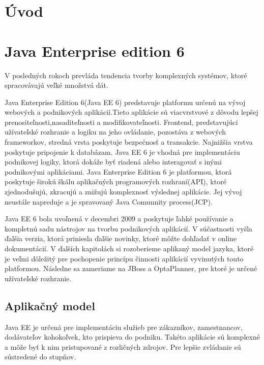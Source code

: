 

\chapter{Úvod}





\chapter{Java Enterprise edition 6}
V posledných rokoch prevláda tendencia tvorby komplexných systémov, ktoré spracovávajú veľké množstvá dát.
 


Java Enterprise Edition 6(Java EE 6) predstavuje platformu určenú na vývoj webových a podnikových aplikácií.\cite{fitWeb}Tieto aplikácie sú viacvrstvové z dôvodu lepšej prenositeľnosti,nasaditeľnosti a modifikovateľnosti. Frontend, predstavujúci užívateľské rozhranie a logiku na jeho ovládanie, pozostáva z webových frameworkov, stredná vrsta poskytuje bezpečnosť a transakcie. Najnižšia vrstva poskytuje pripojenie k databázam. Java EE 6 je vhodná pre implementáciu podnikovej logiky, ktorá dokáže byť riadená alebo interagovať s inými podnikovými aplikáciami. Java Enterprise Edition 6 je platformou, ktorá poskytuje širokú škálu aplikačných programových rozhraní(API), ktoré zjednodušujú, zkracujú a znižujú komplexnosť výslednej aplikácie. Jej vývoj neustále napreduje a je spravovaný Java Comunnity process(JCP).


\indent Java EE 6 bola uvoľnená v decembri 2009 a poskytuje ľahké používanie a kompletnú sadu nástrojov na tvorbu podnikových aplikácií. V súčastnosti vyšla ďalšia verzia, ktorá priniesla ďalšie novinky, ktoré môžte dohľadať v online dokumentácií. V ďalších kapitolách si rozoberieme aplikaný model jazyka, ktoré je veľmi dôležitý pre pochopenie princípu činnosti aplikácií vyvinutých touto platformou. Následne sa zameriame na JBoss a OptaPlanner, pre ktoré je určené užívateľské rozhranie. 


\section{Aplikačný model}
Java EE je určená pre implementáciu služieb pre zákazníkov, zamestnancov, dodávateľov kohokoľvek, kto prispieva do podniku. Takéto aplikácie sú komplexné a môže byť k nim pristupované z rozličných zdrojov. Pre lepšie zvládanie sú sústredené do stupňov.

